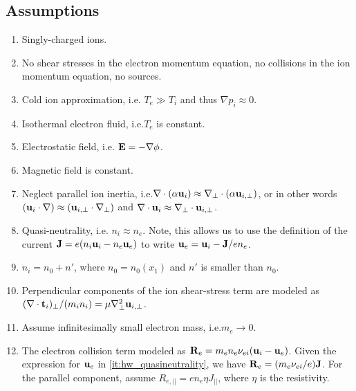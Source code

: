 \documentclass[oneside,a4paper,11pt]{report}
\begin{document}
\subsection{Assumptions}
\begin{enumerate}
    \item Singly-charged ions. \label{it:hw_single_charge_ions}
    \item No shear stresses in the electron momentum equation, no collisions in the ion momentum equation, no sources. \label{it:hw_no_shear_source_coll}
    \item Cold ion approximation, i.e. $T_e \gg T_i$ and thus $\nabla p_i \approx 0$. \label{it:hw_cold}
    \item Isothermal electron fluid, i.e.\@ $T_e$ is constant. \label{it:hw_isothermal_electron}
    \item Electrostatic field, i.e. $\mathbf{E} = -\nabla \phi$. \label{it:hw_electrostatic}
    \item Magnetic field is constant.
    \item Neglect parallel ion inertia, i.e.\@ $\nabla \cdot (\alpha \mathbf{u}_i) \approx \nabla_\perp \cdot (\alpha \mathbf{u}_{i,\perp})$, or in other words $(\mathbf{u}_i \cdot \nabla) \approx (\mathbf{u}_{i,\perp} \cdot \nabla_\perp)$ and $\nabla \cdot \mathbf{u}_i \approx \nabla_\perp \cdot \mathbf{u}_{i,\perp}$. \label{it:hw_par_ion}
    \item Quasi-neutrality, i.e. $n_i \approx n_e$. Note, this allows us to use the definition of the current $\mathbf{J} = e (n_i \mathbf{u}_i - n_e \mathbf{u}_e)$ to write $\mathbf{u}_e = \mathbf{u}_i - \mathbf{J}/e n_e$. \label{it:hw_quasineutrality}
    \item $n_i = n_0 + n'$, where $n_0 = n_0(x_1)$ and $n'$ is smaller than $n_0$. \label{it:hw_ion_density}
    \item Perpendicular components of the ion shear-stress term are modeled as $(\nabla \cdot \mathbf{t}_i)_\perp/(m_i n_i) = \mu \nabla_\perp^2 \mathbf{u}_{i,\perp}$. \label{it:hw_shear_stress}
    \item Assume infinitesimally small electron mass, i.e.\@ $m_e \to 0$. \label{it:hw_small_electron_mass}
    \item The electron collision term modeled as $\mathbf{R}_e = m_e n_e \nu_{ei} (\mathbf{u}_i - \mathbf{u}_e)$. Given the expression for $\mathbf{u}_e$ in \cref{it:hw_quasineutrality}, we have $\mathbf{R}_e = (m_e \nu_{ei}/e) \mathbf{J}$. For the parallel component, assume $R_{e,||} = e n_e \eta J_{||}$, where $\eta$ is the resistivity. \label{it:hw_electron_collisions}
\end{enumerate}
\end{document}
